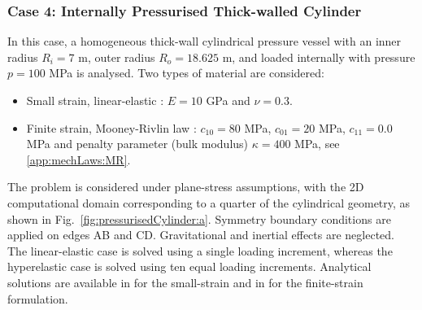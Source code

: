 \documentclass[review,3p]{elsarticle}
\begin{document}
\subsubsection{Case 4: Internally Pressurised Thick-walled Cylinder}
%
In this case, a homogeneous thick-wall cylindrical pressure vessel with an inner radius $R_i = 7$ m, outer radius $R_o = 18.625$ m, and loaded internally with pressure $p = 100$ MPa is analysed. Two types of material are considered:
\begin{itemize}
	\item[i.] Small strain, linear-elastic \cite{Bijelonja2006}: $E=10$ GPa and $\nu=0.3$.
	\item[ii.] Finite strain, Mooney-Rivlin law \cite{Bijelonja2005a}: $c_{10} = 80$ MPa, $c_{01} = 20$ MPa, $c_{11} = 0.0$ MPa and penalty parameter (bulk modulus) $\kappa=400$ MPa, see \ref{app:mechLaws:MR}.
\end{itemize}
The problem is considered under plane-stress assumptions, with the 2D computational domain corresponding to a quarter of the cylindrical geometry, as shown in Fig.~\ref{fig:pressurisedCylinder:a}. Symmetry boundary conditions are applied on edges AB and CD. Gravitational and inertial effects are neglected. The linear-elastic case is solved using a single loading increment, whereas the hyperelastic case is solved using ten equal loading increments. Analytical solutions are available in \cite{Timoshenko1970} for the small-strain and in \cite{Green1992} for the finite-strain formulation.
\end{document}
